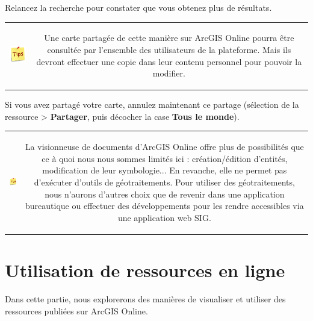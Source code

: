 \documentclass[11pt]{article}
\newcommand{\action}{$\Rightarrow$ }
\newcommand{\reponse}{
	\begin{tabbing}
	\hspace{2cm}\=\kill
	Réponse \> ............................................................................................ \\ 
 	\> ............................................................................................
	\end{tabbing}
}
\newenvironment{note}{%
	\begin{tabular}[t t]{c c}
		\includegraphics{img/tips.png}
		 &
		\begin{minipage}[c]{0.9\linewidth}
			\begin{sffamily}
}{%
			\end{sffamily}
		\end{minipage}
	\end{tabular}	
}
\begin{document}
Relancez la recherche pour constater que vous obtenez plus de résultats.

\begin{note}
Une carte partagée de cette manière sur ArcGIS Online pourra être consultée par l'ensemble des utilisateurs de la plateforme. Mais ils devront effectuer une copie dans leur contenu personnel pour pouvoir la modifier.
\end{note}

Si vous avez partagé votre carte, annulez maintenant ce partage (sélection de la ressource > \textbf{Partager}, puis décocher la case \textbf{Tous le monde}).

\begin{note}
La visionneuse de documents d'ArcGIS Online offre plus de possibilités que ce à quoi nous nous sommes limités ici : création/édition d'entités, modification de leur symbologie... En revanche, elle ne permet pas d'exécuter d'outils de géotraitements. Pour utiliser des géotraitements, nous n'aurons d'autres choix que de revenir dans une application bureautique ou effectuer des développements pour les rendre accessibles via une application web SIG.
\end{note}

%
%
%
%
%
%
%



\section{Utilisation de ressources en ligne}
Dans cette partie, nous explorerons des manières de visualiser et utiliser des ressources publiées sur ArcGIS Online.
\end{document}
